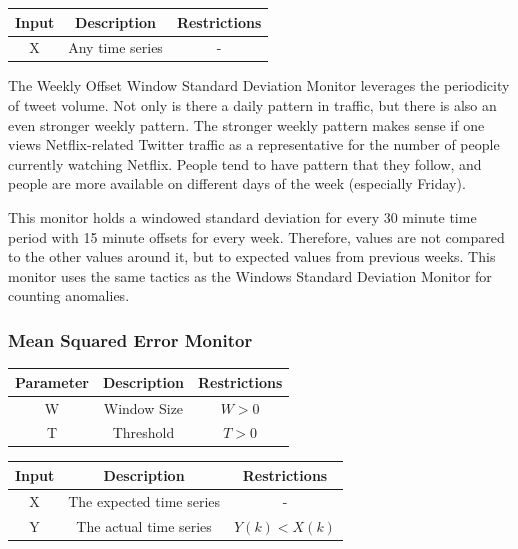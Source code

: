 \documentclass[12pt]{ucthesis}
\begin{document}
\begin{table}[H]
   \begin{center}
      \begin{tabular}{|c|c|c|}
         \hline
            Input & Description & Restrictions \\
         \hline
            X & Any time series & - \\
         \hline
      \end{tabular}
   \end{center}
\end{table}

The Weekly Offset Window Standard Deviation Monitor leverages the periodicity of tweet volume.
Not only is there a daily pattern in traffic, but there is also an even stronger weekly pattern.
The stronger weekly pattern makes sense if one views Netflix-related Twitter traffic as a representative for the number of
people currently watching Netflix. People tend to have pattern that they follow, and people are more available
on different days of the week (especially Friday).

This monitor holds a windowed standard deviation for every 30 minute time period with 15 minute offsets
for every week. Therefore, values are not compared to the other values around it, but to expected values from
previous weeks. This monitor uses the same tactics as the Windows Standard Deviation Monitor for counting anomalies.

\subsubsection{Mean Squared Error Monitor}
\label{outage-detection-monitors-MSE}
\begin{table}[H]
   \begin{center}
      \begin{tabular}{|c|c|c|}
         \hline
            Parameter & Description & Restrictions \\
         \hline
            W & Window Size & $ W > 0 $\\
         \hline
            T & Threshold & $ T > 0 $\\
         \hline
      \end{tabular}
   \end{center}
\end{table}

\begin{table}[H]
   \begin{center}
      \begin{tabular}{|c|c|c|}
         \hline
            Input & Description & Restrictions \\
         \hline
            X & The expected time series & - \\
         \hline
            Y & The actual time series & $ Y(k) < X(k) $ \\
         \hline
      \end{tabular}
   \end{center}
\end{table}
\end{document}
